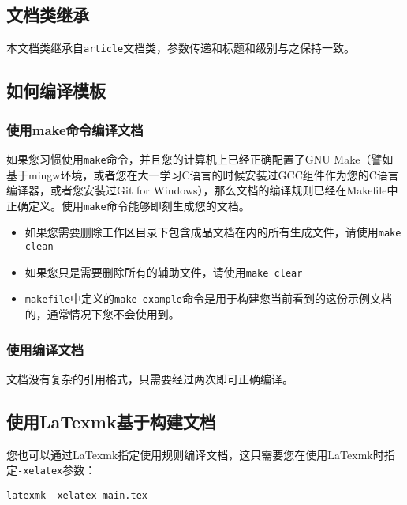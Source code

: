 \documentclass[12pt]{dlmuupcsrep}
\begin{document}
\subsection{文档类继承}

本文档类继承自\texttt{article}文档类，参数传递和标题和级别与之保持一致。

\subsection{如何编译模板}

\subsubsection{使用make命令编译文档}

如果您习惯使用\texttt{make}命令，并且您的计算机上已经正确配置了GNU Make（譬如基于mingw环境，或者您在大一学习C语言的时候安装过GCC组件作为您的C语言编译器，或者您安装过Git for Windows），那么文档的编译规则已经在Makefile中正确定义。使用\texttt{make}命令能够即刻生成您的文档。

\begin{itemize}
    \item 如果您需要删除工作区目录下包含成品文档在内的所有生成文件，请使用\texttt{make clean}
    \item 如果您只是需要删除所有的辅助文件，请使用\texttt{make clear}
    \item \texttt{makefile}中定义的\texttt{make example}命令是用于构建您当前看到的这份示例文档的，通常情况下您不会使用到。
\end{itemize}

\subsubsection{使用\XeLaTeX 编译文档}

文档没有复杂的引用格式，只需要经过两次\XeLaTeX 即可正确编译。

\subsection{使用LaTexmk基于\XeLaTeX 构建文档}

您也可以通过LaTexmk指定使用\XeLaTeX 规则编译文档，这只需要您在使用LaTexmk时指定\texttt{-xelatex}参数：

\begin{verbatim}
latexmk -xelatex main.tex
\end{verbatim}
\end{document}
